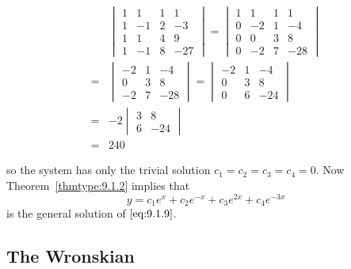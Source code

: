 \documentclass{ximera}
\begin{document}
\begin{example}
\begin{explanation}
\begin{equation} \label{eq:9.1.12}
\begin{array}{ll}
&\begin{vmatrix}1&1&1&1\\1&-1&2&-3\\1&1&4&9\\
1&-1&8&-27\end{vmatrix}=
\begin{vmatrix}1&1&1&1\\0&-2&1&-4\\0&0&3&8\\
0&-2&7&-28\end{vmatrix}\\
=&\begin{vmatrix}-2&1&-4\\0&3&8\\
-2&7&-28\end{vmatrix}
=\begin{vmatrix}-2&1&-4\\0&3&8
\\0&6&-24\end{vmatrix}\\
=&-2\begin{vmatrix}3&8\\6&-24\end{vmatrix}\\
=&240
\end{array}
\end{equation}

so the system has only the trivial solution $c_1=c_2=c_3=c_4=0$.
Now Theorem~\ref{thmtype:9.1.2} implies that
$$
y=c_1e^x+c_2e^{-x}+c_3e^{2x}+c_4e^{-3x}
$$
is the general solution of $\eqref{eq:9.1.9}$.

\end{explanation}
\end{example}

\subsection*{The Wronskian}
\end{document}
